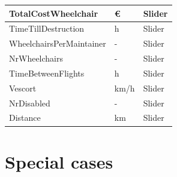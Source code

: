 \documentclass[a4paper, 11pt, notitlepage]{report}
\begin{document}
\begin{table}[h]
\begin{tabular}{|l|l|l|}
TotalCostWheelchair      & \euro    & Slider                                                             \\ \hline
TimeTillDestruction      & h        & Slider                                                             \\ \hline
WheelchairsPerMaintainer & -        & Slider                                                             \\ \hline
NrWheelchairs            & -        & Slider                                                             \\ \hline
TimeBetweenFlights       & h        & Slider                                                             \\ \hline
Vescort                  & km/h     & Slider                                                             \\ \hline
NrDisabled               & -        & Slider                                                             \\ \hline
Distance                 & km       & Slider                                                             \\ \hline
\end{tabular}
\end{table}
\chapter{Special cases}
\end{document}
